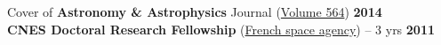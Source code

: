 \documentclass[11pt]{article}
\begin{document}
\vspace{-0.3cm}
Cover of \textbf{Astronomy \& Astrophysics} Journal (\href{https://www.aanda.org/articles/aa/abs/2014/04/contents/contents.html}{Volume 564}) \hfill  \textbf{2014}\\


\vspace{-0.3cm}
\textbf{CNES Doctoral Research Fellowship} (\href{https://cnes.fr/en/web/CNES-en/7430-research-grants.php}{French space agency}) -- 3 yrs  \hfill   \textbf{2011}\\ %





\end{document}
